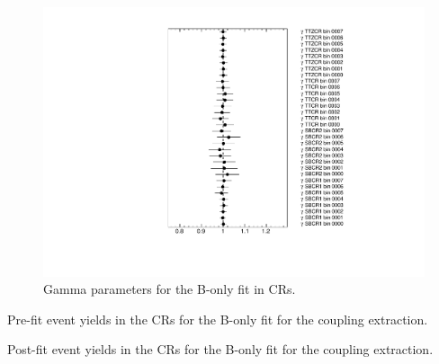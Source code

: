 \begin{figure}[htbp]
	\centering
	\includegraphics[width=.85\textwidth]{Chapters/CH7/figures/BONLY_CR_UsingDL1rcFullSys/Gammas}
	\caption{Gamma parameters for the B-only \tZc fit in CRs.}%
	\label{fig:stat:tzc:bonly:cr:gamma}
\end{figure}

\FloatBarrier

\begin{table}[]
	\footnotesize
	\centering
	
	\caption{Pre-fit event yields in the CRs for the B-only fit for the \tZc coupling extraction. \TabErrStatSys} 
	\label{tab:stat:tzc:bonly:cr:yields:prefit}
\end{table} 
\begin{table}[]
	\footnotesize
	\centering
	
	\caption{Post-fit event yields in the CRs for the B-only fit for the \tZc coupling extraction. \TabErrStatSys} 
	\label{tab:stat:tzc:bonly:cr:yields:postfit}
\end{table} 

\FloatBarrier

